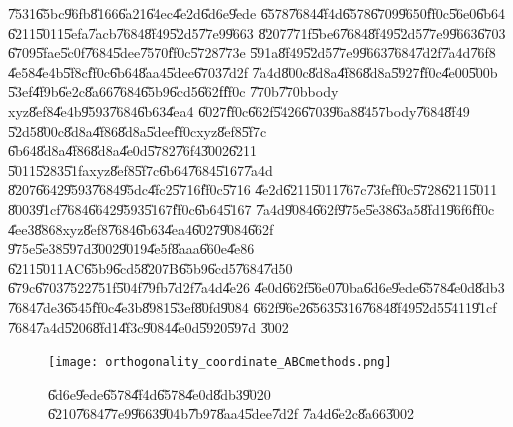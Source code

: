 \U{7531}\U{65bc}\U{96fb}\U{8166}\U{6a21}\U{64ec}\U{4e2d}\U{6d6e}\U{9ede}%
\U{6578}\U{7684}\U{4f4d}\U{6578}\U{6709}\U{9650}\U{ff0c}\U{56e0}\U{6b64}%
\U{6211}\U{5011}\U{5efa}\U{7acb}\U{7684}\U{8f49}\U{52d5}\U{77e9}\U{9663}%
\U{8207}\U{771f}\U{5be6}\U{7684}\U{8f49}\U{52d5}\U{77e9}\U{9663}\U{6703}%
\U{6709}\U{5fae}\U{5c0f}\U{7684}\U{5dee}\U{7570}\U{ff0c}\U{5728}\U{773e}%
\U{591a}\U{8f49}\U{52d5}\U{77e9}\U{9663}\U{7684}\U{7d2f}\U{7a4d}\U{76f8}%
\U{4e58}\U{4e4b}\U{5f8c}\U{ff0c}\U{6b64}\U{8aa4}\U{5dee}\U{6703}\U{7d2f}%
\U{7a4d}\U{800c}\U{8d8a}\U{4f86}\U{8d8a}\U{5927}\U{ff0c}\U{4e00}\U{500b}%
\U{53ef}\U{4f9b}\U{6e2c}\U{8a66}\U{7684}\U{65b9}\U{6cd5}\U{662f}\U{ff0c}%
\U{770b}\U{770b}body xyz\U{8ef8}\U{4e4b}\U{9593}\U{7684}\U{6b63}\U{4ea4}%
\U{6027}\U{ff0c}\U{662f}\U{5426}\U{6703}\U{96a8}\U{8457}body\U{7684}\U{8f49}%
\U{52d5}\U{800c}\U{8d8a}\U{4f86}\U{8d8a}\U{5dee}\U{ff0c}xyz\U{8ef8}\U{5f7c}%
\U{6b64}\U{8d8a}\U{4f86}\U{8d8a}\U{4e0d}\U{5782}\U{76f4}\U{3002}\U{6211}%
\U{5011}\U{5283}\U{51fa}xyz\U{8ef8}\U{5f7c}\U{6b64}\U{7684}\U{5167}\U{7a4d}%
\U{8207}\U{6642}\U{9593}\U{7684}\U{95dc}\U{4fc2}\U{5716}\U{ff0c}\U{5716}%
\U{4e2d}\U{6211}\U{5011}\U{767c}\U{73fe}\U{ff0c}\U{5728}\U{6211}\U{5011}%
\U{8003}\U{91cf}\U{7684}\U{6642}\U{9593}\U{5167}\U{ff0c}\U{6b64}\U{5167}%
\U{7a4d}\U{9084}\U{662f}\U{975e}\U{5e38}\U{63a5}\U{8fd1}\U{96f6}\U{ff0c}%
\U{4ee3}\U{8868}xyz\U{8ef8}\U{7684}\U{6b63}\U{4ea4}\U{6027}\U{9084}\U{662f}%
\U{975e}\U{5e38}\U{597d}\U{3002}\U{9019}\U{4e5f}\U{8aaa}\U{660e}\U{4e86}%
\U{6211}\U{5011}AC\U{65b9}\U{6cd5}\U{8207}B\U{65b9}\U{6cd5}\U{7684}\U{7d50}%
\U{679c}\U{6703}\U{7522}\U{751f}\U{504f}\U{79fb}\U{7d2f}\U{7a4d}\U{4e26}%
\U{4e0d}\U{662f}\U{56e0}\U{70ba}\U{6d6e}\U{9ede}\U{6578}\U{4e0d}\U{8db3}%
\U{7684}\U{7de3}\U{6545}\U{ff0c}\U{4e3b}\U{8981}\U{53ef}\U{80fd}\U{9084}%
\U{662f}\U{96e2}\U{6563}\U{5316}\U{7684}\U{8f49}\U{52d5}\U{5411}\U{91cf}%
\U{7684}\U{7a4d}\U{5206}\U{8fd1}\U{4f3c}\U{9084}\U{4e0d}\U{5920}\U{597d}%
\U{3002}

\begin{figure}[th]
\caption{\U{6d6e}\U{9ede}\U{6578}\U{4f4d}\U{6578}\U{4e0d}\U{8db3}\U{9020}%
\U{6210}\U{7684}\U{77e9}\U{9663}\U{904b}\U{7b97}\U{8aa4}\U{5dee}\U{7d2f}%
\U{7a4d}\U{6e2c}\U{8a66}\U{3002}}
\begin{center}
\texttt{[image: orthogonality\_coordinate\_ABCmethods.png]}
\end{center}
\end{figure}

\clearpage%

